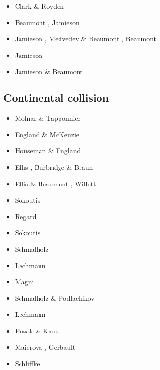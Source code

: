 \begin{scriptsize}
\begin{itemize}
\item[\twothousand] Clark \& Royden \cite{clro00}
\item[\twothousandfour] Beaumont \etal \cite{bejn04}, Jamieson \etal \cite{jabm04}
\item[\twothousandsix] Jamieson \etal \cite{jabn06}, Medvedev \& Beaumont \cite{mebe06}, 
                        Beaumont \etal \cite{benj06}
\item[\twothousandseven] Jamieson \etal \cite{jabn07}
\item[\twothousandeleven] Jamieson \& Beaumont \cite{jabe11}
\end{itemize}
\end{scriptsize}

\subsection*{Continental collision} 

\begin{scriptsize}
\begin{itemize}
\item[\nineteenseventyfive] Molnar \& Tapponnier \cite{mota75}
\item[\nineteeneightytwo] England \& McKenzie \cite{enmc82} 
\item[\nineteeneightysix] Houseman \& England \cite{hoen86a}
\item[\nineteenninetyeight] Ellis \etal \cite{elbj98}, Burbridge \& Braun \cite{bubr98}
\item[\nineteenninetynine] Ellis \& Beaumont \cite{elbe99}, Willett \cite{will99b}
\item[\twothousand] Sokoutis \etal \cite{sobm00}
\item[\twothousandthree] Regard \etal \cite{refm03}
\item[\twothousandfive] Sokoutis \etal \cite{sobb05}
\item[\twothousandnine] Schmalholz \etal \cite{sckb09}
\item[\twothousandeleven] Lechmann \etal \cite{lemk11}
\item[\twothousandtwelve] Magni \etal \cite{mavf12}
\item[\twothousandthirteen] Schmalholz \& Podlachikov \cite{scpo13}
\item[\twothousandfourteen] Lechmann \etal \cite{lesh14}
\item[\twothousandfifteen] Pusok \& Kaus \cite{puka15}
\item[\twothousandeighteen] Maierova \etal \cite{masg18}, Gerbault \etal \cite{gesr18}
\item[\twothousandtwentyone] Schliffke \etal \cite{scvg21}
\end{itemize}
\end{scriptsize}

